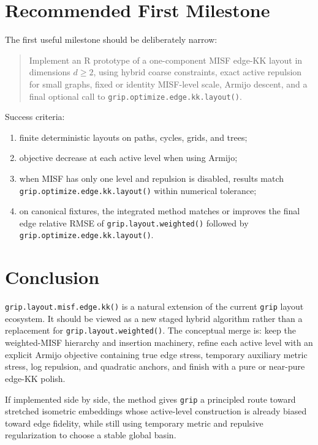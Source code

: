 \documentclass[11pt]{article}
\newcommand{\grip}{\texttt{grip}}
\newcommand{\Rfunc}[1]{\texttt{#1}}
\begin{document}
\section{Recommended First Milestone}

The first useful milestone should be deliberately narrow:
\begin{quote}
Implement an R prototype of a one-component MISF edge-KK layout in dimensions
\(d\ge2\), using hybrid coarse constraints, exact active repulsion for small
graphs, fixed or identity MISF-level scale, Armijo descent, and a final optional
call to
\Rfunc{grip.optimize.edge.kk.layout()}.
\end{quote}

Success criteria:
\begin{enumerate}[leftmargin=2em]
  \item finite deterministic layouts on paths, cycles, grids, and trees;
  \item objective decrease at each active level when using Armijo;
  \item when MISF has only one level and repulsion is disabled, results match
  \Rfunc{grip.optimize.edge.kk.layout()} within numerical tolerance;
  \item on canonical fixtures, the integrated method matches or improves the
  final edge relative RMSE of \Rfunc{grip.layout.weighted()} followed by
  \Rfunc{grip.optimize.edge.kk.layout()}.
\end{enumerate}

\section{Conclusion}

\Rfunc{grip.layout.misf.edge.kk()} is a natural extension of the current
\grip{} layout ecosystem. It should be viewed as a new staged hybrid algorithm
rather than a replacement for \Rfunc{grip.layout.weighted()}. The conceptual
merge is: keep the weighted-MISF hierarchy and insertion machinery, refine each
active level with an explicit Armijo objective containing true edge stress,
temporary auxiliary metric stress, log repulsion, and quadratic anchors, and
finish with a pure or near-pure edge-KK polish.

If implemented side by side, the method gives \grip{} a principled route toward
stretched isometric embeddings whose active-level construction is already
biased toward edge fidelity, while still using temporary metric and repulsive
regularization to choose a stable global basin.
\end{document}
